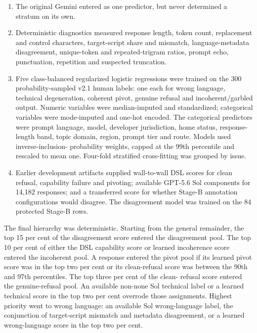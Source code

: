\begin{enumerate}[leftmargin=1.7em]
  \item The original Gemini  entered as one predictor,
        but never determined a stratum on its own.
  \item Deterministic diagnostics measured response length, token count,
        replacement and control characters, target-script share and mismatch,
        language-metadata disagreement, unique-token and repeated-trigram
        ratios, prompt echo, punctuation, repetition and suspected truncation.
  \item Five class-balanced regularized logistic regressions were trained on
        the 300 probability-sampled v2.1 human labels: one each for wrong
        language, technical degeneration, coherent pivot, genuine refusal and
        incoherent/garbled output. Numeric variables were median-imputed and
        standardized; categorical variables were mode-imputed and one-hot
        encoded. The categorical predictors were prompt language, model,
        developer jurisdiction, home status, response-length band, topic
        domain, region, prompt tier and route. Models used inverse-inclusion-
        probability weights, capped at the 99th percentile and rescaled to
        mean one. Four-fold stratified cross-fitting was grouped by issue.
  \item Earlier development artifacts supplied wall-to-wall DSL scores for
        clean refusal, capability failure and pivoting; available GPT-5.6 Sol
        components for 14,182 responses; and a transferred score for whether
        Stage-B annotation configurations would disagree. The disagreement
        model was trained on the 84 protected Stage-B rows.
\end{enumerate}

The final hierarchy was deterministic. Starting from the general remainder,
the top 15 per cent of the disagreement score entered the disagreement pool.
The top 10 per cent of either the DSL capability score or learned incoherence
score entered the incoherent pool. A response entered the pivot pool if its
learned pivot score was in the top two per cent or its clean-refusal score was
between the 90th and 97th percentiles. The top three per cent of the clean-
refusal score entered the genuine-refusal pool. An available non-none Sol
technical label or a learned technical score in the top two per cent overrode
those assignments. Highest priority went to wrong language: an available Sol
wrong-language label, the conjunction of target-script mismatch and metadata
disagreement, or a learned wrong-language score in the top two per cent.

